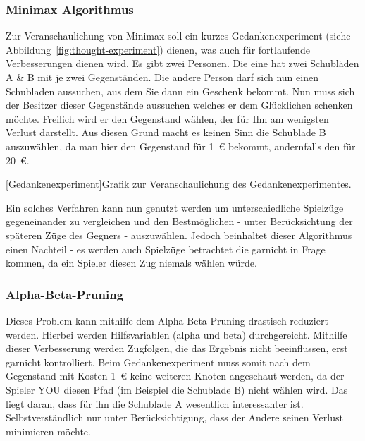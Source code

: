 \subsubsection{Minimax Algorithmus}\label{subsubsec:minimax-algorithmus}
Zur Veranschaulichung von Minimax soll ein kurzes Gedankenexperiment (siehe Abbildung~\ref{fig:thought-experiment}) dienen, was auch f\"ur fortlaufende Verbesserungen dienen wird.
Es gibt zwei Personen.
Die eine hat zwei Schubl\"aden A \& B mit je zwei Gegenst\"anden.
Die andere Person darf sich nun einen Schubladen aussuchen, aus dem Sie dann ein Geschenk bekommt.
Nun muss sich der Besitzer dieser Gegenst\"ande aussuchen welches er dem Gl\"ucklichen schenken m\"ochte.
Freilich wird er den Gegenstand w\"ahlen, der f\"ur Ihn am wenigsten Verlust darstellt.
Aus diesen Grund macht es keinen Sinn die Schublade B auszuw\"ahlen, da man hier den Gegenstand f\"ur 1~\euro{} bekommt, andernfalls den f\"ur 20~\euro{}.

\vspace{1em}
\begin{center}
    [Gedankenexperiment]{Grafik zur Veranschaulichung des Gedankenexperimentes.}
    \label{fig:thought-experiment}
\end{center}

Ein solches Verfahren kann nun genutzt werden um unterschiedliche Spielz\"uge gegeneinander zu vergleichen und den Bestm\"oglichen - unter Ber\"ucksichtung der sp\"ateren Z\"uge des Gegners - auszuw\"ahlen.
Jedoch beinhaltet dieser Algorithmus einen Nachteil - es werden auch Spielz\"uge betrachtet die garnicht in Frage kommen, da ein Spieler diesen Zug niemals w\"ahlen w\"urde.

\subsubsection{Alpha-Beta-Pruning}\label{subsubsec:alpha-beta-pruning}
Dieses Problem kann mithilfe dem Alpha-Beta-Pruning drastisch reduziert werden.
Hierbei werden Hilfsvariablen (alpha und beta) durchgereicht.
Mithilfe dieser Verbesserung werden Zugfolgen, die das Ergebnis nicht beeinflussen, erst garnicht kontrolliert.
Beim Gedankenexperiment muss somit nach dem Gegenstand mit Kosten 1~\euro{} keine weiteren Knoten angeschaut werden, da der Spieler YOU diesen Pfad (im Beispiel die Schublade B) nicht w\"ahlen wird.
Das liegt daran, dass f\"ur ihn die Schublade A wesentlich interessanter ist.
Selbstverst\"andlich nur unter Ber\"ucksichtigung, dass der Andere seinen Verlust minimieren m\"ochte.

